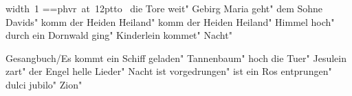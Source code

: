 \ifx\mxversion\undefined
  
  
  
  
\fi

%
\newbox\datebox%
\hbox{\pdfximage width 1\pdfrefximage\pdflastximage}
\setbox\datebox=\hbox{\font\datefont=phvr at 12pt\datefont{}\hbox to }%
\ht\datebox=0pt%
\box\datebox%
\vfill\eject
\tableofcontents
\normalmusicsize
 die Tore weit"
 Gebirg Maria geht"
 dem Sohne Davids"
 komm der Heiden Heiland"
 komm der Heiden Heiland"
\makeatletter
{}
\makeatother
 Himmel hoch"
 durch ein Dornwald ging"
 Kinderlein kommet"
 Nacht"

 Gesangbuch/Es kommt ein Schiff geladen"
 Tannenbaum"
 hoch die Tuer"
 Jesulein zart"
\makeatletter
{}
\makeatother
 der Engel helle Lieder"
 Nacht ist vorgedrungen"
 ist ein Ros entprungen"
\makeatletter
{}
\makeatother
 dulci jubilo"
\makeatletter
{}
\makeatother
 Zion"
\bookbye